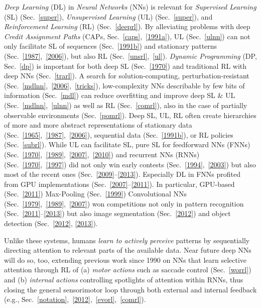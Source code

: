\documentclass[letterpaper]{article}
\begin{document}
\begin{CJK*}{UTF8}{gbsn}
\begin{sloppypar}
{\em Deep Learning} (DL) in 
{\em Neural Networks} (NNs)
is relevant for
{\em Supervised Learning} (SL) (Sec.~\ref{super}),
{\em Unsupervised Learning} (UL) (Sec.~\ref{super}), and
{\em Reinforcement Learning} (RL) (Sec.~\ref{deeprl}).
By alleviating problems with deep {\em Credit Assignment Paths} (CAPs, Sec.~\ref{caps},~\ref{1991a}),
UL (Sec.~\ref{ulnn}) can not only facilitate 
SL of sequences  
(Sec.~\ref{1991b}) and 
stationary patterns
(Sec.~\ref{1987},~\ref{2006}), but also 
RL (Sec.~\ref{unsrl},~\ref{ul}). 
{\em Dynamic Programming} (DP, Sec.~\ref{dp}) is important for both 
deep SL (Sec.~\ref{1970})
and traditional RL with deep NNs (Sec.~\ref{trarl}).
A search for solution-computing, 
perturbation-resistant (Sec.~\ref{mdlnn},~\ref{2006},~\ref{tricks}),
low-complexity  NNs 
describable by few bits of information (Sec.~\ref{mdl}) can 
reduce overfitting and 
improve
deep SL \& UL (Sec.~\ref{mdlnn},~\ref{ulnn}) as well as RL (Sec.~\ref{comrl}),
also in the case of partially observable environments (Sec.~\ref{pomrl}). 
Deep SL, UL, RL often create hierarchies of more and more abstract  
representations of stationary data (Sec.~\ref{1965},~\ref{1987},~\ref{2006}),
sequential data (Sec.~\ref{1991b}), or RL policies (Sec.~\ref{subrl}). 
While UL can facilitate SL, pure SL for feedforward NNs (FNNs) (Sec.~\ref{1970},~\ref{1989},~\ref{2007},~\ref{2010})
and recurrent NNs (RNNs) (Sec.~\ref{1970},~\ref{1997})
did not only win early contests (Sec.~\ref{1994},~\ref{2003}) but also
most of the recent ones   
(Sec.~\ref{2009}--\ref{2013}).
Especially DL in FNNs profited from 
GPU implementations (Sec.~\ref{2007}--\ref{2011}).
In particular, 
GPU-based (Sec.~\ref{2011}) Max-Pooling (Sec.~\ref{1999}) Convolutional NNs (Sec.~\ref{1979},~\ref{1989},~\ref{2007})
won competitions not only in pattern recognition (Sec.~\ref{2011}--\ref{2013}) 
but also
image segmentation (Sec.~\ref{2012})
and object detection (Sec.~\ref{2012}, \ref{2013}).

Unlike these systems, humans {\em learn to actively perceive} patterns by sequentially directing attention to relevant parts of the available data. Near future deep NNs will do so, too, extending previous work since 1990 on NNs that learn selective attention through RL of (a) {\em motor actions} such as saccade control (Sec.~\ref{worrl}) and (b)  {\em internal actions} controlling spotlights of attention within RNNs, thus closing the general sensorimotor loop through both external and internal feedback (e.g., Sec.~\ref{notation},~\ref{2012},~\ref{evorl},~\ref{comrl}).


\end{sloppypar}
\end{CJK*}
\end{document}
